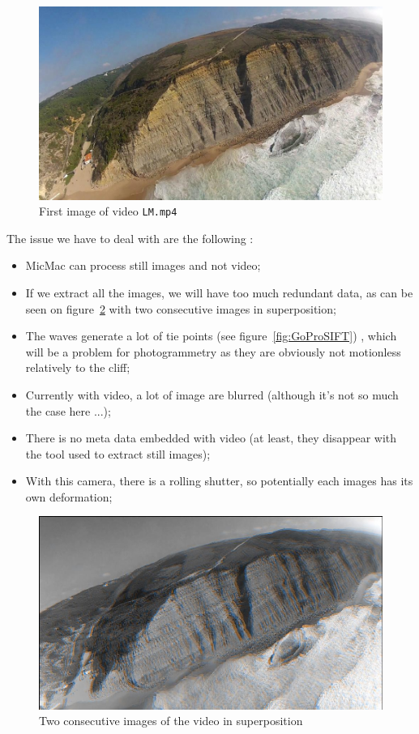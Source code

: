 \begin{figure}
\centering
\includegraphics[width=0.8\linewidth]{FIGS/GoProVideo/Im1Ok.jpg}
\caption{First image of video  {\tt LM.mp4}}
\label{fig:GoProIm1}
\end{figure}


The issue we have to deal with are the following :

\begin{itemize}
   \item MicMac can process still images and not video;
   \item If we extract all the images, we will have too much redundant data, as can be seen
         on figure~\ref{fig:GoProCloseWave} with two consecutive images in superposition;
   \item The waves generate a lot of tie points (see figure~\ref{fig:GoProSIFT}) , which will be 
         a problem for photogrammetry as  they are 
         obviously not motionless relatively to the cliff;
          
   \item Currently with video, a lot of image are blurred (although it's not so much the case here ...);
   \item  There is no meta data embedded with video (at least, they disappear with the tool used to extract
          still images);
   \item  With this camera, there is a rolling shutter, so potentially each images has its own deformation;
\end{itemize}


\begin{figure}
\centering
\includegraphics[width=0.80\linewidth]{FIGS/GoProVideo/Proches.jpg}
\caption{Two consecutive images of the video in superposition}
\label{fig:GoProCloseWave}
\end{figure}



